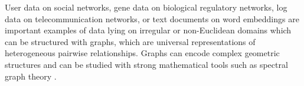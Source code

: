\documentclass{article}
\newcommand{\bO}{\mathcal{O}}
\begin{document}



User data on social networks, gene data on biological regulatory networks, log
data on telecommunication networks, or text documents on word embeddings are
important examples of data lying on irregular or non-Euclidean domains which
can be structured with graphs, which are universal representations of
heterogeneous pairwise relationships. Graphs can encode complex geometric
structures and can be studied with strong mathematical tools such as spectral
graph theory \cite{book:Chung97Spectral}.
\end{document}
